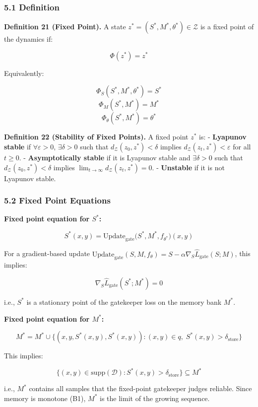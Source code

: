 \documentclass[
  12pt,
]{ctexart}
\begin{document}
\subsubsection{5.1 Definition}\label{definition-2}

\textbf{Definition 21 (Fixed Point).} A state
\(z^* = (S^*, M^*, \theta^*) \in \mathcal{Z}\) is a fixed point of the
dynamics if:

\[\Phi(z^*) = z^*\]

Equivalently:

\[\Phi_S(S^*, M^*, \theta^*) = S^*\] \[\Phi_M(S^*, M^*) = M^*\]
\[\Phi_\theta(S^*, M^*) = \theta^*\]

\textbf{Definition 22 (Stability of Fixed Points).} A fixed point
\(z^*\) is: - \textbf{Lyapunov stable} if \(\forall \varepsilon > 0\),
\(\exists \delta > 0\) such that \(d_{\mathcal{Z}}(z_0, z^*) < \delta\)
implies \(d_{\mathcal{Z}}(z_t, z^*) < \varepsilon\) for all
\(t \geq 0\). - \textbf{Asymptotically stable} if it is Lyapunov stable
and \(\exists \delta > 0\) such that
\(d_{\mathcal{Z}}(z_0, z^*) < \delta\) implies
\(\lim_{t\to\infty} d_{\mathcal{Z}}(z_t, z^*) = 0\). - \textbf{Unstable}
if it is not Lyapunov stable.

\subsubsection{5.2 Fixed Point Equations}\label{fixed-point-equations}

\textbf{Fixed point equation for \(S^*\):}

\[S^*(x, y) = \text{Update}_{\text{gate}}\bigl(S^*, M^*, f_{\theta^*}\bigr)(x, y)\]

For a gradient-based update
\(\text{Update}_{\text{gate}}(S, M, f_\theta) = S - \alpha \nabla_S \hat{L}_{\text{gate}}(S; M)\),
this implies:

\[\nabla_S \hat{L}_{\text{gate}}(S^*; M^*) = 0\]

i.e., \(S^*\) is a stationary point of the gatekeeper loss on the memory
bank \(M^*\).

\textbf{Fixed point equation for \(M^*\):}

\[M^* = M^* \cup \{(x, y, S^*(x,y), S^*(x,y)) : (x,y) \in q, \; S^*(x,y) > \delta_{\text{store}}\}\]

This implies:

\[\{ (x,y) \in \text{supp}(\mathcal{D}) : S^*(x,y) > \delta_{\text{store}} \} \subseteq M^*\]

i.e., \(M^*\) contains all samples that the fixed-point gatekeeper
judges reliable. Since memory is monotone (B1), \(M^*\) is the limit of
the growing sequence.
\end{document}
